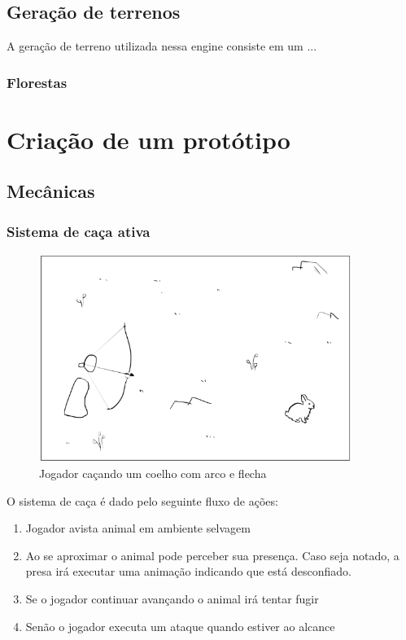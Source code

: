 \documentclass[12pt, 
openright, 
oneside, 
a4paper,    
brazil]{facom-ufu-abntex2}
\begin{document}
\section{Geração de terrenos}
A geração de terreno utilizada nessa engine consiste em um ...
\subsection{Florestas}


\chapter{Criação de um protótipo}
\label{sec:desenv}
\section{Mecânicas}
\subsection{Sistema de caça ativa}
\begin{figure}[H]
	\centering
	\includegraphics[width=4in]{imagens/mecanica_caca.png}
	\caption{Jogador caçando um coelho com arco e flecha}
\end{figure}
O sistema de caça é dado pelo seguinte fluxo de ações:
\begin{enumerate}  
\item Jogador avista animal em ambiente selvagem 
\item Ao se aproximar o animal pode perceber sua presença. Caso seja notado, a presa irá executar uma animação indicando que está desconfiado.
\item Se o jogador continuar avançando o animal irá tentar fugir 
\item Senão o jogador executa um ataque quando estiver ao alcance 
\end{enumerate}
\end{document}
